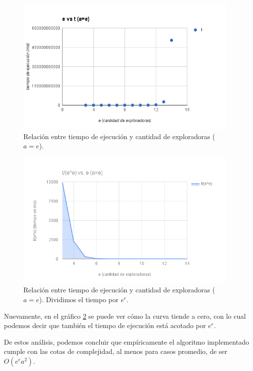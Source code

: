  \begin{figure}[h!]
   \begin{center}
 	\includegraphics[width=11cm]{imagenes/ej3/EA-t.png}
	\caption{Relación entre tiempo de ejecución y cantidad de exploradoras ($a=e$).}
	\label{EAt}
   \end{center}
 \end{figure}
 
 \begin{figure}[h!]
   \begin{center}
 	\includegraphics[width=11cm]{imagenes/ej3/EA-tdividido.png}
	\caption{Relación entre tiempo de ejecución y cantidad de exploradoras ($a=e$). Dividimos el tiempo por $e^e$.}
	\label{EAtdividido}
   \end{center}
 \end{figure}
 
 Nuevamente, en el gráfico \ref{EAtdividido} se puede ver cómo la curva tiende a cero, con lo cual podemos decir que también el tiempo de ejecución está acotado por $e^e$.
 
 De estos análisis, podemos concluir que empíricamente el algoritmo implementado cumple con las cotas de complejidad, al menos para casos promedio, de ser $O(e^e a^2)$.
 
